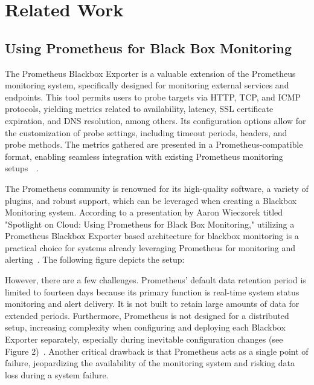 
\chapter{Related Work}\label{chapter:related_work}

\section{Using Prometheus for Black Box Monitoring}

The Prometheus Blackbox Exporter is a valuable extension of the Prometheus monitoring system, specifically designed for monitoring external services and endpoints. This tool permits users to probe targets via HTTP, TCP, and ICMP protocols, yielding metrics related to availability, latency, SSL certificate expiration, and DNS resolution, among others. Its configuration options allow for the customization of probe settings, including timeout periods, headers, and probe methods. The metrics gathered are presented in a Prometheus-compatible format, enabling seamless integration with existing Prometheus monitoring setups~\parencite{prometheusOverviewPrometheus}~\parencite{prometheusBlackboxExporter2023}. 

The Prometheus community is renowned for its high-quality software, a variety of plugins, and robust support, which can be leveraged when creating a Blackbox Monitoring system. According to a presentation by Aaron Wieczorek titled "Spotlight on Cloud: Using Prometheus for Black Box Monitoring," utilizing a Prometheus Blackbox Exporter based architecture for blackbox monitoring is a practical choice for systems already leveraging Prometheus for monitoring and alerting~\parencite{oreillySpotlightCloudUsing}. The following figure depicts the setup: 

However, there are a few challenges. Prometheus' default data retention period is limited to fourteen days because its primary function is real-time system status monitoring and alert delivery. It is not built to retain large amounts of data for extended periods. Furthermore, Prometheus is not designed for a distributed setup, increasing complexity when configuring and deploying each Blackbox Exporter separately, especially during inevitable configuration changes (see Figure 2)~\parencite{prometheusOverviewPrometheus}. Another critical drawback is that Prometheus acts as a single point of failure, jeopardizing the availability of the monitoring system and risking data loss during a system failure. 

